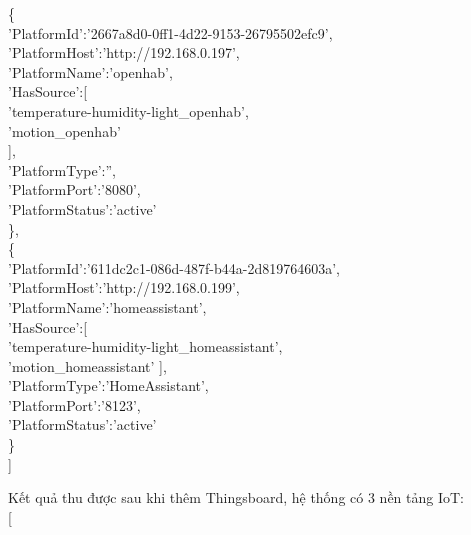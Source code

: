 \blank{1cm}\{\\
\blank{2cm}'PlatformId':'2667a8d0-0ff1-4d22-9153-26795502efc9',\\
\blank{2cm}'PlatformHost':'http://192.168.0.197',\\
\blank{2cm}'PlatformName':'openhab',\\
\blank{2cm}'HasSource':[\\
\blank{3cm}'temperature-humidity-light\_openhab',\\
\blank{3cm}'motion\_openhab'\\
\blank{3cm}],\\
\blank{2cm}'PlatformType':'',\\
\blank{2cm}'PlatformPort':'8080',\\
\blank{2cm}'PlatformStatus':'active'\\
\blank{1cm}\},\\
\blank{1cm}\{\\
\blank{2cm}'PlatformId':'611dc2c1-086d-487f-b44a-2d819764603a',\\
\blank{2cm}'PlatformHost':'http://192.168.0.199',\\
\blank{2cm}'PlatformName':'homeassistant',\\
\blank{2cm}'HasSource':[\\
\blank{3cm}'temperature-humidity-light\_homeassistant',\\
\blank{3cm}'motion\_homeassistant'
\blank{2cm}],\\
\blank{2cm}'PlatformType':'HomeAssistant',\\
\blank{2cm}'PlatformPort':'8123',\\
\blank{2cm}'PlatformStatus':'active'\\
\blank{1cm}\}\\
]

Kết quả thu được sau khi thêm Thingsboard, hệ thống có 3 nền tảng IoT:\\

[\\

